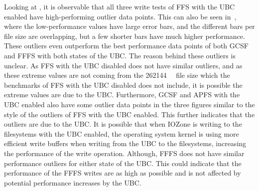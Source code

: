 Looking at , it is observable that all three write tests of \gls{FFS} with the \gls{UBC} enabled have \mbox{high-performing} outlier data points. This can also be seen in~, where the low-performance values have large error bars, and the different bars per file size are overlapping, but a few shorter bars have much higher performance. These outliers even outperform the best performance data points of both \gls{GCSF} and \gls{FFFS} with both states of the \gls{UBC}. The reason behind these outliers is unclear. As \gls{FFS} with the \gls{UBC} disabled does not have similar outliers, and as these extreme values are not coming from the \SI{262144}{\kilo\byte} file size which the benchmarks of \gls{FFS} with the \gls{UBC} disabled does not include, it is possible the extreme values are due to the \gls{UBC}. Furthermore, \gls{GCSF} and \gls{APFS} with the \gls{UBC} enabled also have some outlier data points in the three figures similar to the style of the outliers of \gls{FFS} with the \gls{UBC} enabled. This further indicates that the outliers are due to the \gls{UBC}. It is possible that when IOZone is writing to the filesystems with the \gls{UBC} enabled, the operating system kernel is using more efficient write buffers when writing from the \gls{UBC} to the filesystems, increasing the performance of the write operation. Although, \gls{FFFS} does not have similar performance outliers for either state of the \gls{UBC}. This could indicate that the performance of the \gls{FFFS} writes are as high as possible and is not affected by potential performance increases by the \gls{UBC}.



